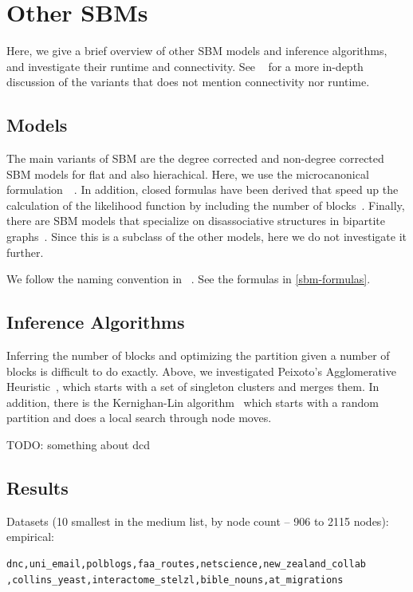 \documentclass[aps,pre,superscriptaddress]{revtex4}
\begin{document}
\section{Other SBMs}

Here, we give a brief overview of other SBM models and inference algorithms, and investigate their runtime and connectivity.
See ~\cite{funke19-04} for a more in-depth discussion of the variants that does not mention connectivity nor runtime.

\subsection*{Models}

The main variants of SBM are the degree corrected and non-degree corrected SBM models for flat and also hierachical.
Here, we use the microcanonical formulation~\cite{peixoto17-01}~\cite{peixoto14-03}.
In addition, closed formulas have been derived that speed up the calculation of the likelihood function by including the number of blocks~\cite{come15-12}.
Finally, there are SBM models that specialize on disassociative structures in bipartite graphs~\cite{yen20-09}.
Since this is a subclass of the other models, here we do not investigate it further.

We follow the naming convention in ~\cite{funke19-04}.
See the formulas in \ref{sbm-formulas}.

\subsection*{Inference Algorithms}

Inferring the number of blocks and optimizing the partition given a number of blocks is difficult to do exactly.
Above, we investigated Peixoto's Agglomerative Heuristic~\cite{peixoto14-01}, which starts with a set of singleton clusters and merges them.
In addition, there is the Kernighan-Lin algorithm~\cite{kernighan70-02} which starts with a random partition and does a local search through node moves.

TODO: something about dcd

\subsection*{Results}


Datasets (10 smallest in the medium list, by node count -- 906 to 2115 nodes):
empirical:
\begin{verbatim}
dnc,uni_email,polblogs,faa_routes,netscience,new_zealand_collab
,collins_yeast,interactome_stelzl,bible_nouns,at_migrations    
\end{verbatim}
\end{document}
